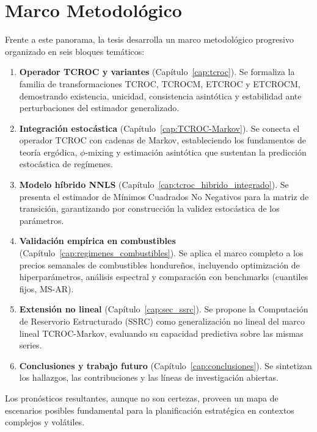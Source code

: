 \section{Marco Metodológico}

Frente a este panorama, la tesis desarrolla un marco metodológico
progresivo organizado en seis bloques temáticos:

\begin{enumerate}
    \item \textbf{Operador TCROC y variantes}
    (Capítulo~\ref{cap:tcroc}).  Se formaliza la familia de
    transformaciones TCROC, TCROCM, ETCROC y ETCROCM, demostrando
    existencia, unicidad, consistencia asintótica y estabilidad
    ante perturbaciones del estimador generalizado.

    \item \textbf{Integración estocástica}
    (Capítulo~\ref{cap:TCROC-Markov}).  Se conecta el operador TCROC
    con cadenas de Markov, estableciendo los fundamentos de teoría
    ergódica, $\phi$-mixing y estimación asintótica que sustentan la
    predicción estocástica de regímenes.

    \item \textbf{Modelo híbrido NNLS}
    (Capítulo~\ref{cap:tcroc_hibrido_integrado}).  Se presenta el estimador de
    Mínimos Cuadrados No Negativos para la matriz de transición,
    garantizando por construcción la validez estocástica de los
    parámetros.

    \item \textbf{Validación empírica en combustibles}
    (Capítulo~\ref{cap:regimenes_combustibles}).  Se aplica el marco completo a
    los precios semanales de combustibles hondureños, incluyendo
    optimización de hiperparámetros, análisis espectral y comparación
    con benchmarks (cuantiles fijos, MS-AR).

    \item \textbf{Extensión no lineal}
    (Capítulo~\ref{cap:sec_ssrc}).  Se propone la Computación de
    Reservorio Estructurado (SSRC) como generalización no lineal
    del marco lineal TCROC-Markov, evaluando su capacidad predictiva
    sobre las mismas series.

    \item \textbf{Conclusiones y trabajo futuro}
    (Capítulo~\ref{cap:conclusiones}).  Se sintetizan los hallazgos,
    las contribuciones y las líneas de investigación abiertas.
\end{enumerate}

Los pronósticos resultantes, aunque no son certezas, proveen un mapa
de escenarios posibles fundamental para la planificación estratégica
en contextos complejos y volátiles.
